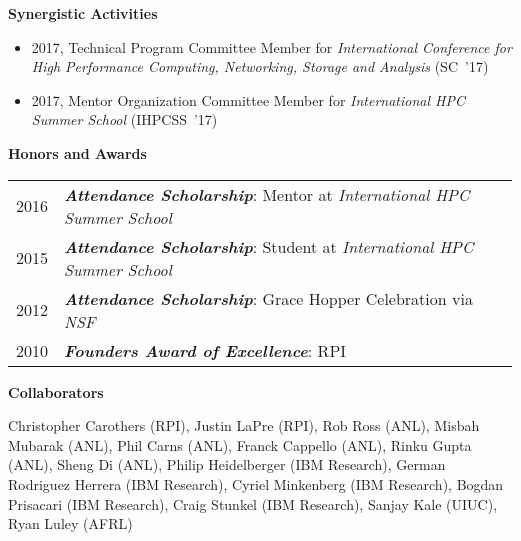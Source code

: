 \documentclass[times,11pt]{article}    %
\begin{document}
\vskip 3pt
\textbf{\sffamily Synergistic Activities}

\begin{itemize}
\item 2017, Technical Program Committee Member for {\em International Conference for High Performance Computing, Networking, Storage and Analysis} (SC~'17)
\item 2017, Mentor Organization Committee Member for {\em International HPC Summer School} (IHPCSS~'17)
\end{itemize}

\vskip 6pt
\textbf{\sffamily Honors and Awards}
\vskip 6pt

\begin{tabular}{ll}
2016 & {\em \bf Attendance Scholarship}: Mentor at {\em International HPC Summer School}\\
2015 & {\em \bf Attendance Scholarship}: Student at {\em International HPC Summer School}\\
2012 & {\em \bf Attendance Scholarship}: Grace Hopper Celebration via {\em NSF}\\
2010 & {\em \bf Founders Award of Excellence}: RPI
\end{tabular}
\vskip 6pt

\textbf{\sffamily Collaborators}

Christopher Carothers (RPI), Justin LaPre (RPI),
Rob Ross (ANL), Misbah Mubarak (ANL), Phil Carns (ANL),
Franck Cappello (ANL), Rinku Gupta (ANL), Sheng Di (ANL),
Philip Heidelberger (IBM Research), German Rodriguez Herrera (IBM Research), Cyriel Minkenberg (IBM Research), Bogdan Prisacari (IBM Research), Craig Stunkel (IBM Research),
Sanjay Kale (UIUC),
Ryan Luley (AFRL)



\end{document}
